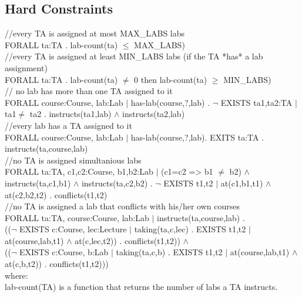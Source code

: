 \documentclass{article}
\begin{document}
\pagebreak
\begin{appendices}

  \section*{Hard Constraints}

  //every TA is assigned at most MAX\_LABS labs\\ FORALL ta:TA .
  lab-count(ta) $\leq$ MAX\_LABS)\\

  //every TA is assigned at least MIN\_LABS labs (if the TA *has* a
  lab assignment)\\ FORALL ta:TA . lab-count(ta) $\not=$ 0 then
  lab-count(ta) $\geq$ MIN\_LABS)\\

  // no lab has more than one TA assigned to it\\ FORALL
  course:Course, lab:Lab $|$ has-lab(course,?,lab) . $\lnot$ EXISTS
  ta1,ta2:TA $|$ ta1$\not=$ ta2 . instructs(ta1,lab) $\land$
  instructs(ta2,lab)\\

  //every lab has a TA assigned to it\\ FORALL course:Course, lab:Lab
  $|$ has-lab(course,?,lab). EXITS ta:TA . instructs(ta,course,lab)\\

  //no TA is assigned simultanious labs\\ FORALL ta:TA, c1,c2:Course,
  b1,b2:Lab $|$ (c1=c2 => b1 $\not=$ b2) $\land$ instructs(ta,c1,b1)
  $\land$ instructs(ta,c2,b2) . $\lnot$ EXISTS t1,t2 $|$ at(c1,b1,t1)
  $\land$ at(c2,b2,t2) . conflicts(t1,t2)\\

  //no TA is assigned a lab that conflicts with his/her own
  courses\\ FORALL ta:TA, course:Course, lab:Lab $|$
  instructs(ta,course,lab) .\\ (($\lnot$ EXISTS c:Course, lec:Lecture
  $|$ taking(ta,c,lec) . EXISTS t1,t2 $|$ at(course,lab,t1) $\land$
  at(c,lec,t2)) . conflicts(t1,t2)) $\land$\\ (($\lnot$ EXISTS
  c:Course, b:Lab $|$ taking(ta,c,b) . EXISTS t1,t2 $|$
  at(course,lab,t1) $\land$ at(c,b,t2)) . conflicts(t1,t2)))\\

  where:\\ lab-count(TA) is a function that returns the number of labs
  a TA instructs.\\

\end{appendices}
\end{document}

